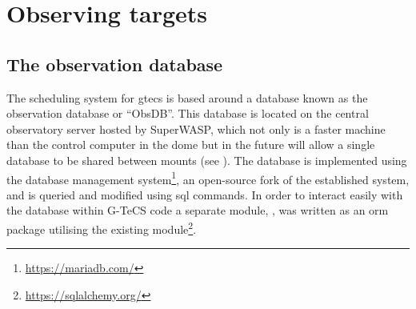 \section{Observing targets}
\label{sec:observing}
\begin{colsection}


\begin{colsection}


\end{colsection}

\subsection{The observation database}
\label{sec:obsdb}
\begin{colsection}

The scheduling system for \gls{gtecs} is based around a database known as the observation database or ``ObsDB''. This database is located on the central observatory server hosted by SuperWASP, which not only is a faster machine than the control computer in the dome but in the future will allow a single database to be shared between mounts (see ). The database is implemented using the  database management system\footnote{\url{https://mariadb.com/}}, an open-source fork of the established  system, and is queried and modified using \gls{sql} commands. In order to interact easily with the database within G-TeCS code a separate  module, , was written as an \gls{orm} package utilising the existing  module\footnote{\url{https://sqlalchemy.org/}}.


\end{colsection}
\end{colsection}

